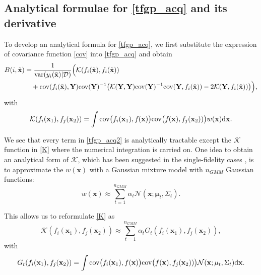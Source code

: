 \documentclass[11pt]{article}
\begin{document}
\subsection{Analytical formulae for \eqref{tfgp_acq} and its derivative}
To develop an analytical formula for \eqref{tfgp_acq}, we first substitute the expression of covariance function \eqref{cov} into  \eqref{tfgp_acq} and obtain
\begin{align}
    B(i,\tilde{\mathbf{x}}) & = 
    \frac{1}{{\rm{var}}(y_i(\tilde{\mathbf{x}})|\mathcal{D})} 
    \Big(
    \mathcal{K}(f_i(\tilde{\mathbf{x}}), f_i(\tilde{\mathbf{x}})) 
\nonumber \\
    & \quad + 
    {\rm{cov}}(f_i(\tilde{\mathbf{x}}), \mathbf{Y}) {\rm{cov}}(\mathbf{Y})^{-1} \big( \mathcal{K}(\mathbf{Y},\mathbf{Y})  {\rm{cov}}(\mathbf{Y})^{-1} {\rm{cov}}(\mathbf{Y}, f_i(\tilde{\mathbf{x}})) 
    - 2\mathcal{K}(\mathbf{Y}, f_i(\tilde{\mathbf{x}}))  \big )
    \Big),
\label{tfgp_acq2}
\end{align}
with
\begin{equation}
    \mathcal{K}(f_i(\mathbf{x}_1), f_j(\mathbf{x}_2)) = \int {\rm{cov}}\big(f_i(\mathbf{x}_1), f_{}(\mathbf{x})\big) {\rm{cov}}\big(f_{}(\mathbf{x}), f_j(\mathbf{x}_2))\big) w(\mathbf{x}) \mathrm{d} \mathbf{x}.
\label{K}
\end{equation}

We see that every term in \eqref{tfgp_acq2} is analytically tractable except the $\mathcal{K}$ function in \eqref{K} where the numerical integration is carried on. One idea to obtain an analytical form of $\mathcal{K}$, which has been suggested in the single-fidelity cases \cite{blanchard2021output,gong2021discussion}, is to approximate the $w(\mathbf{x})$ with a Gaussian mixture model \cite{Goodfellow-et-al-2016} with $n_{GMM}$ Gaussian functions:  
\begin{equation}
    w(\mathbf{x}) \approx \sum_{t=1}^{n_{GMM}} \alpha_t \mathcal{N}(\mathbf{x}; \mathbf{\mu}_t,\Sigma_t).
\label{gmm}
\end{equation}

This allows us to reformulate \eqref{K} as
\begin{equation}
     \mathcal{K}(f_i(\mathbf{x}_1), f_j(\mathbf{x}_2)) 
     \approx \sum_{t=1}^{n_{GMM}} \alpha_t G_t(f_i(\mathbf{x}_1), f_j(\mathbf{x}_2)),
\label{K_appro}
\end{equation}
with
\begin{equation}
     G_t(f_i(\mathbf{x}_1), f_j(\mathbf{x}_2)) = \int  {\rm{cov}}\big(f_i(\mathbf{x}_1), f(\mathbf{x})\big) {\rm{cov}}\big(f(\mathbf{x}), f_j(\mathbf{x}_2))\big) \mathcal{N}(\mathbf{x}; \mathbf{\mu}_t,\Sigma_t) \mathrm{d} \mathbf{x}.
\label{G}
\end{equation}
\end{document}
